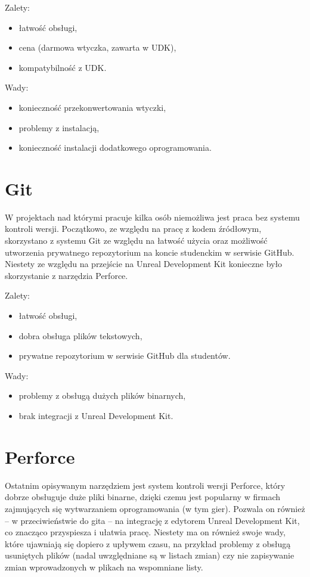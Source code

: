 {\raggedright Zalety:
\begin{itemize}
\item łatwość obsługi,
\item cena (darmowa wtyczka, zawarta w UDK),
\item kompatybilność z UDK.
\end{itemize}

\raggedright Wady:
\begin{itemize}
\item konieczność przekonwertowania wtyczki,
\item problemy z instalacją,
\item konieczność instalacji dodatkowego oprogramowania.
\end{itemize}
}

\section{Git}

W projektach nad którymi pracuje kilka osób niemożliwa jest praca bez systemu kontroli wersji. Początkowo, ze względu na pracę z kodem źródłowym, skorzystano z systemu Git ze względu na łatwość użycia oraz możliwość utworzenia prywatnego repozytorium na koncie studenckim w serwisie GitHub. Niestety ze względu na przejście na Unreal Development Kit konieczne było skorzystanie z narzędzia Perforce.\\

\raggedright Zalety:
\begin{itemize}
\item łatwość obsługi,
\item dobra obsługa plików tekstowych,
\item prywatne repozytorium w serwisie GitHub dla studentów.
\end{itemize}

\raggedright Wady:
\begin{itemize}
\item problemy z obsługą dużych plików binarnych,
\item brak integracji z Unreal Development Kit.
\end{itemize}

\section{Perforce}

Ostatnim opisywanym narzędziem jest system kontroli wersji Perforce, który dobrze obsługuje duże pliki binarne, dzięki czemu jest popularny w firmach zajmujących się wytwarzaniem oprogramowania (w tym gier). Pozwala on również -- w przeciwieństwie do gita -- na integrację z edytorem Unreal Development Kit, co znacząco przyspiesza i ułatwia pracę. Niestety ma on również swoje wady, które ujawniają się dopiero z upływem czasu, na przykład problemy z obsługą usuniętych plików (nadal uwzględniane są w listach zmian) czy nie zapisywanie zmian wprowadzonych w plikach na wspomniane listy.

